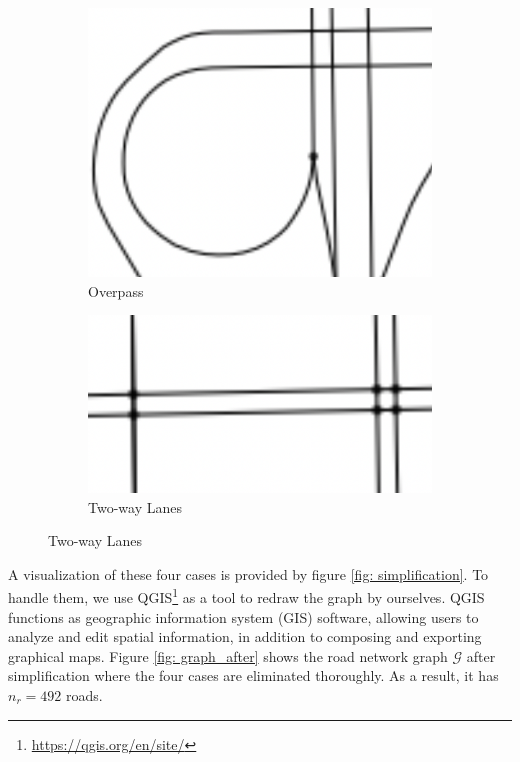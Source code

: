 \begin{figure}[htb]
  \begin{subfigure}[t]{0.22\linewidth}
    \centering
    \includegraphics[width=\textwidth]{images/overpass.png}
    \caption{Overpass}
    \label{fig: overpass}
  \end{subfigure}
  \begin{subfigure}[t]{0.22\linewidth}
    \centering
    \includegraphics[width=\textwidth]{images/two-way.png}
    \caption{Two-way Lanes}
    \label{fig: two-way}
  \end{subfigure}
\end{figure}

A visualization of these four cases is provided by figure \ref{fig: simplification}. To handle them, we use QGIS\footnote{\href{https://qgis.org/en/site/}{https://qgis.org/en/site/}} as a tool to redraw the graph by ourselves. QGIS functions as geographic information system (GIS) software, allowing users to analyze and edit spatial information, in addition to composing and exporting graphical maps. Figure \ref{fig: graph_after} shows the road network graph $\mathcal G$ after simplification where the four cases are eliminated thoroughly. As a result, it has $n_r=492$ roads. 

